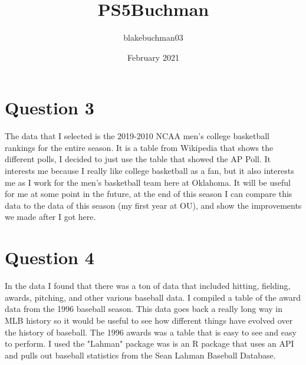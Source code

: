 \documentclass{article}
\title{PS5Buchman}
\author{blakebuchman03 }
\date{February 2021}
\begin{document}
\maketitle

\section{Question 3}
The data that I selected is the 2019-2010 NCAA men's college basketball rankings for the entire season. It is a table from Wikipedia that shows the different polls, I decided to just use the table that showed the AP Poll. It interests me because I really like college basketball as a fan, but it also interests me as I work for the men's basketball team here at Oklahoma. It will be useful for me at some point in the future, at the end of this season I can compare this data to the data of this season (my first year at OU), and show the improvements we made after I got here. 
\section{Question 4}
In the data I found that there was a ton of data that included hitting, fielding, awards, pitching, and other various baseball data. I compiled a table of the award data from the 1996 baseball season. This data goes back a really long way in MLB history so it would be useful to see how different things have evolved over the history of baseball. The 1996 awards was a table that is easy to see and easy to perform. I used the "Lahman" package was is an R package that uses an API and pulls out baseball statistics from the Sean Lahman Baseball Database. 
\end{document}
